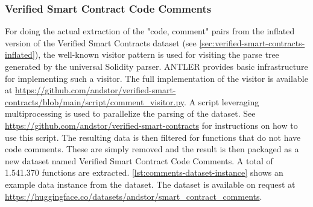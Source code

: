\subsubsection{Verified Smart Contract Code Comments}
\label{sec:verified-smart-contract-code-comments}
For doing the actual extraction of the "code, comment" pairs from the inflated version of the Verified Smart Contracts dataset (see \cref{sec:verified-smart-contracts-inflated}), the well-known visitor pattern \cite{visitor-pattern} is used for visiting the parse tree generated by the universal Solidity parser. ANTLER provides basic infrastructure for implementing such a visitor. The full implementation of the visitor is available at \url{https://github.com/andstor/verified-smart-contracts/blob/main/script/comment_visitor.py}. A script leveraging multiprocessing is used to parallelize the parsing of the dataset. See \url{https://github.com/andstor/verified-smart-contracts} for instructions on how to use this script. The resulting data is then filtered for functions that do not have code comments. These are simply removed and the result is then packaged as a new dataset named Verified Smart Contract Code Comments. A total of 1.541.370 functions are extracted. \cref{lst:comments-dataset-instance} shows an example data instance from the dataset. The dataset is available on request at \url{https://huggingface.co/datasets/andstor/smart_contract_comments}.



